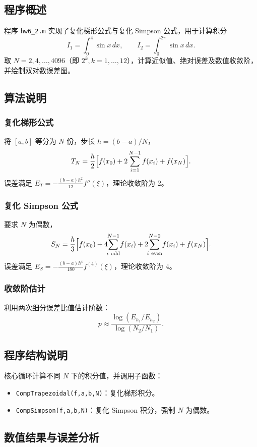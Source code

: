 \documentclass[12pt,a4paper]{article}
\begin{document}
\subsection{程序概述}

程序 \texttt{hw6\_2.m} 实现了复化梯形公式与复化 Simpson 公式，用于计算积分
\[
I_1 = \int_0^4 \sin x \, dx,\qquad
I_2 = \int_0^{2\pi} \sin x \, dx.
\]
取 \(N=2,4,\dots,4096\)（即 \(2^k, k=1,\dots,12\)），计算近似值、绝对误差及数值收敛阶，并绘制双对数误差图。

\subsection{算法说明}

\subsubsection{复化梯形公式}
将 \([a,b]\) 等分为 \(N\) 份，步长 \(h=(b-a)/N\)，
\[
T_N = \frac{h}{2}\Bigl[f(x_0)+2\sum_{i=1}^{N-1}f(x_i)+f(x_N)\Bigr].
\]
误差满足 \(E_T = -\frac{(b-a)h^2}{12}f''(\xi)\)，理论收敛阶为 \(2\)。

\subsubsection{复化 Simpson 公式}
要求 \(N\) 为偶数，
\[
S_N = \frac{h}{3}\Bigl[f(x_0)+4\!\!\sum_{i\ \text{odd}}^{N-1}\!f(x_i)+2\!\!\sum_{i\ \text{even}}^{N-2}\!f(x_i)+f(x_N)\Bigr].
\]
误差满足 \(E_S = -\frac{(b-a)h^4}{180}f^{(4)}(\xi)\)，理论收敛阶为 \(4\)。

\subsubsection{收敛阶估计}
利用两次细分误差比值估计阶数：
\[
p \approx \frac{\log(E_{h_1}/E_{h_2})}{\log(N_2/N_1)}.
\]

\subsection{程序结构说明}

核心循环计算不同 \(N\) 下的积分值，并调用子函数：
\begin{itemize}
    \item \texttt{CompTrapezoidal(f,a,b,N)}：复化梯形积分。
    \item \texttt{CompSimpson(f,a,b,N)}：复化 Simpson 积分，强制 \(N\) 为偶数。
\end{itemize}

\subsection{数值结果与误差分析}
\end{document}
